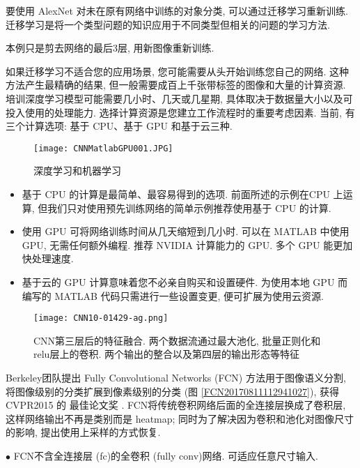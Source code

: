 要使用 AlexNet 对未在原有网络中训练的对象分类, 可以通过迁移学习重新训练.
迁移学习是将一个类型问题的知识应用于不同类型但相关的问题的学习方法. 
\begin{example}
本例只是剪去网络的最后3层, 用新图像重新训练.

如果迁移学习不适合您的应用场景, 您可能需要从头开始训练您自己的网络. 这种方法产生最精确的结果, 但一般需要成百上千张带标签的图像和大量的计算资源.
培训深度学习模型可能需要几小时、几天或几星期, 具体取决于数据量大小以及可投入使用的处理能力. 选择计算资源是您建立工作流程时的重要考虑因素.
当前, 有三个计算选项: 基于 CPU、基于 GPU 和基于云三种.
\begin{figure}[H]
\centering
\texttt{[image: CNNMatlabGPU001.JPG]}
\caption{深度学习和机器学习}
\label{CNNMatlabGPU001}
\end{figure}
\begin{itemize}
\item 基于 CPU 的计算是最简单、最容易得到的选项. 前面所述的示例在CPU 上运算, 但我们只对使用预先训练网络的简单示例推荐使用基于 CPU 的计算.
\item 使用 GPU 可将网络训练时间从几天缩短到几小时. 可以在 MATLAB 中使用 GPU, 无需任何额外编程. 推荐 NVIDIA 计算能力的 GPU. 多个 GPU 能更加快处理速度.
\item 基于云的 GPU 计算意味着您不必亲自购买和设置硬件. 为使用本地 GPU 而编写的 MATLAB 代码只需进行一些设置变更, 便可扩展为使用云资源.
\end{itemize}
\end{example}
\begin{figure}[H]
    \centering
    \texttt{[image: CNN10-01429-ag.png]}
    \caption{CNN第三层后的特征融合. 两个数据流通过最大池化, 批量正则化和 relu层上的卷积. 两个输出的整合以及第四层的输出形态等特征 \cite{PiramanayagamSaber2018-9591}}
    \label{CNN10-01429-ag}
    \vspace{-0.4cm}
\end{figure}

Berkeley团队提出 Fully Convolutional Networks (FCN) 方法用于图像语义分割, 将图像级别的分类扩展到像素级别的分类 (图 \ref{FCN20170811112941027}), 获得 CVPR2015 的 最佳论文奖 \cite{Long2015-9593}.
FCN将传统卷积网络后面的全连接层换成了卷积层, 这样网络输出不再是类别而是 heatmap; 同时为了解决因为卷积和池化对图像尺寸的影响, 提出使用上采样的方式恢复.

$\bullet$ FCN不含全连接层 (fc)的全卷积 (fully conv)网络. 可适应任意尺寸输入.

